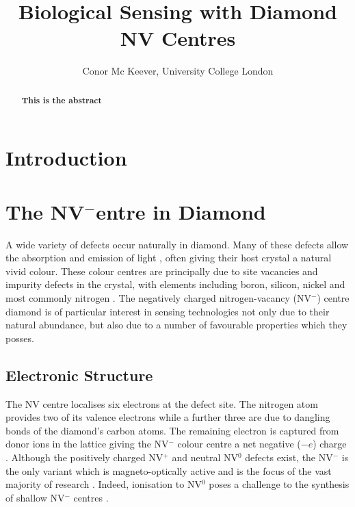 \documentclass[10pt]{article}
\title{\LARGE Biological Sensing with Diamond NV Centres}
\date{}
\author{\vspace{3mm}
Conor Mc Keever, University College London
}
\makeatletter
\renewcommand{\maketitle}{\bgroup\setlength{\parindent}{0pt}
\begin{flushleft}
  \textbf{\@title}

  \@author
\end{flushleft}\egroup
}
\makeatother
\begin{document}
\maketitle
\vspace{0.4cm}

\begin{abstract}
\textbf{This is the abstract}
\end{abstract}


\begin{multicols}{2}
\normalsize
\tableofcontents
\section{Introduction}
\section{The NV\texorpdfstring{$^-$} Centre in Diamond}
A wide variety of defects occur naturally in diamond. Many of these defects allow the absorption and emission of light \cite{zaitsev2001optical}, often giving their host crystal a natural vivid colour. These colour centres are principally due to site vacancies and impurity defects in the crystal, with elements including boron, silicon, nickel and most commonly nitrogen \cite{wu2016diamond}. The negatively charged nitrogen-vacancy (NV$^-$) centre diamond is of particular interest in sensing technologies not only due to their natural abundance, but also due to a number of favourable properties which they posses. 

\subsection{Electronic Structure}
The NV centre localises six electrons at the defect site. The nitrogen atom provides two of its valence electrons while a further three are due to dangling bonds of the diamond's carbon atoms\cite{schirhagl2014nitrogen}. The remaining electron is captured from donor ions in the lattice giving the NV$^-$ colour centre a net negative ($-e$) charge \cite{schirhagl2014nitrogen}. Although the positively charged NV$^+$ and neutral NV$^0$ defects exist, the NV$^-$ is the only variant which is magneto-optically active and is the focus of the vast majority of research \cite{schirhagl2014nitrogen}. Indeed, ionisation to NV$^0$ poses a challenge to the synthesis of shallow NV$^-$ centres \cite{hauf2011chemical}. 



\end{multicols}
\end{document}
